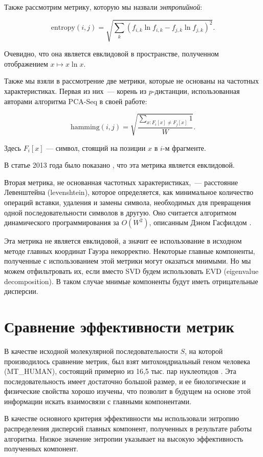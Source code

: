 Также рассмотрим метрику, которую мы назвали \textit{энтропийной}:

$$\text{entropy}(i,j) = \sqrt{\sum_k \left(f_{i,k}\ln f_{i,k} - f_{j,k}\ln f_{j,k}\right)^2}.$$

Очевидно, что она является евклидовой в пространстве, полученном отображением $x \mapsto x\ln x$.

Также мы взяли в рассмотрение две метрики, которые не основаны на частотных характеристиках. Первая из них~--- корень из $p$-дистанции, использованная авторами алгоритма PCA-Seq в своей работе:

$$\text{hamming}(i, j) = \sqrt{\frac{\sum_{x: F_i[x]\neq F_j[x]} 1}{W}}.$$

Здесь $F_i[x]$ --- символ, стоящий на позиции $x$ в $i$-м фрагменте.

В статье 2013 года было показано \cite{Efimov2013}, что эта метрика является евклидовой.

Вторая метрика, не основанная частотных характеристиках,~--- расстояние Левенштейна \cite{levenshtein1965} (levenshtein), которое определяется, как минимальное количество операций вставки, удаления и замены символа, необходимых для превращения одной последовательности символов в другую. Оно считается алгоритмом динамического программирования за $O(W^2)$, описанным Дэном Гасфилдом \cite{gasfild2003}.

Эта метрика не является евклидовой, а значит ее использование в исходном методе главных координат Гауэра некорректно. Некоторые главные компоненты, полученные с использованием этой метрики могут оказаться мнимыми. Но мы можем отфильтровать их, если вместо SVD будем использовать EVD (eigenvalue decomposition). В таком случае мнимые компоненты будут иметь отрицательные дисперсии.

\section{Сравнение эффективности метрик}

В качестве исходной молекулярной последовательности $S$, на которой производилось сравнение метрик, был взят митохондриальный геном человека (MT\_HUMAN), состоящий примерно из 16,5 тыс. пар нуклеотидов \cite{Anderson1981}. Эта последовательность имеет достаточно большой размер, и ее биологические и физические свойства хорошо изучены, что позволит в будущем на основе этой информации искать взаимосвязи с главными компонентами.

В качестве основного критерия эффективности мы использовали энтропию распределения дисперсий главных компонент, полученных в результате работы алгоритма. Низкое значение энтропии указывает на высокую эффективность полученных компонент.


